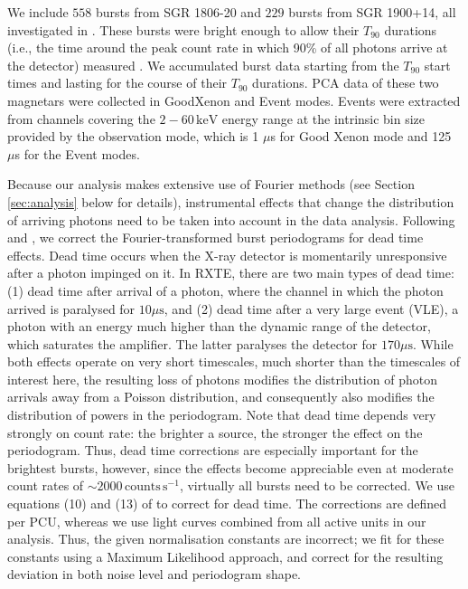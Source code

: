 \documentclass[numberedappendix]{emulateapj}
\begin{document}
We include  $558$ bursts from SGR 1806-20 and $229$ bursts from SGR 1900+14, all investigated in \citet{gogus2001}. These bursts were bright enough to allow their $T_{90}$ durations (i.e., the time around the peak count rate in which 90\% of all photons arrive at the detector) measured \citep{gogus2001}. We accumulated burst data starting from the $T_{90}$ start times and lasting for the course of their $T_{90}$ durations. PCA data of these two magnetars were collected in GoodXenon and Event modes. Events were extracted from channels covering the $2-60\,\mathrm{keV}$ energy range at the intrinsic bin size provided by the observation mode, which is 1 $\mu$s for Good Xenon mode and 125 $\mu$s for the Event modes.  

Because our analysis makes extensive use of Fourier methods (see Section \ref{sec:analysis} below for details), instrumental effects that change the distribution of arriving photons need to be taken into account in the data analysis.
Following \citet{zhang1995} and \citet{jahoda2006}, we correct the Fourier-transformed burst periodograms for dead time effects. Dead time occurs when the X-ray detector is momentarily unresponsive after a photon impinged on it. In RXTE, there are two main types of dead time: (1) dead time after arrival of a photon, where the channel in which the photon arrived is paralysed for $10\mu\mathrm{s}$, and (2) dead time after a very large event (VLE), a photon with an energy much higher than the dynamic range of the detector, which saturates the amplifier. The latter paralyses the detector for $170\mu\mathrm{s}$. While both effects operate on very short timescales, much shorter than the timescales of interest here, the resulting loss of photons modifies the distribution of photon arrivals away from a Poisson distribution, and consequently also modifies the distribution of powers in the periodogram. Note that dead time depends very strongly on count rate: the brighter a source, the stronger the effect on the periodogram. Thus, dead time corrections are especially important for the brightest bursts, however, since the effects become appreciable even at moderate count rates of $\sim 2000 \,\mathrm{counts}\,\mathrm{s}^{-1}$, virtually all bursts need to be corrected. We use equations (10) and (13) of \citet{jahoda2006} to correct for dead time. The corrections are defined per PCU, whereas we use light curves combined from all active units in our analysis. Thus, the given normalisation constants are incorrect; we fit for these constants using a Maximum Likelihood approach, and correct for the resulting deviation in both noise level and periodogram shape. 
\end{document}
